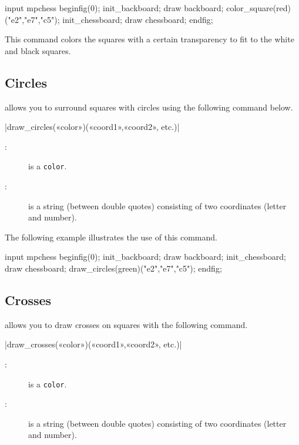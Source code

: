 \documentclass[english]{ltxdoc}
\begin{document}
\begin{ExempleMP}
input mpchess
beginfig(0);
init_backboard;
draw backboard;
color_square(red)("e2","e7","c5");
init_chessboard;
draw chessboard;
endfig;
\end{ExempleMP}

This command colors the squares with a certain transparency to fit to the white
and black squares.

\subsection{Circles}

\mpchess allows you to surround squares with circles using the following command
 below. 

\commande|draw_circles(«color»)(«coord1»,«coord2», etc.)|\smallskip

\begin{description}
\item[:] is a \MP{} \lstinline+color+.
\item[:] is a string (between double quotes) consisting of two
coordinates (letter and number). 
\end{description}

The following example illustrates the use of this command.

\begin{ExempleMP}
input mpchess
beginfig(0);
init_backboard;
draw backboard;
init_chessboard;
draw chessboard;
draw_circles(green)("e2","e7","c5");
endfig;
\end{ExempleMP}



\subsection{Crosses}


\mpchess allows you to draw crosses on squares with the following command.

\commande|draw_crosses(«color»)(«coord1»,«coord2», etc.)|\smallskip

\begin{description}
\item[:] is a \MP{} \lstinline+color+.
\item[:] is a string (between double quotes) consisting of two
coordinates (letter and number). 
\end{description}
\end{document}
